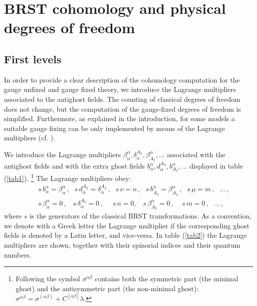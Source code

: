 \documentclass[a4paper,12pt]{article}
\begin{document}

\section{BRST cohomology and physical degrees of freedom}
\label{coho}

\subsection{First levels}
\label{first}

In order to provide a clear description of the cohomology computation
for the gauge unfixed and gauge fixed theory, we introduce the
Lagrange multipliers associated to the antighost fields.  The counting
of classical degrees of freedom does not change, but the computation
of the gauge-fixed degrees of freedom is simplified. Furthermore, as
explained in the introduction, for some models a suitable gauge fixing
can be only implemented by means of the Lagrange multipliers (cf.
\cite{porr_2}).

We introduce the Lagrange multipliers $\beta^\alpha_{\dot\alpha},
\delta^{A_2}_{\dot\alpha}, \beta_{A_2}^{\dot\alpha}, \dots$
associated with the antighost fields and with the extra ghost fields
$b^\alpha_{\dot\alpha}, d^{A_2}_{\dot\alpha}, b_{
  A_2}^{\dot\alpha}, \dots $ displayed in table (\ref{tab1}).
\footnote{Following \cite{GPZ} the symbol $\sigma^{\alpha\beta}$
  contains both the symmetric part (the minimal ghost) and the
  antisymmetric part (the non-minimal ghost): $\sigma^{\alpha \beta}=
  \sigma^{(\alpha \beta)} + C^{[\alpha \beta]}\lambda $.}
The Lagrange multipliers obey: 
\begin{eqnarray}
  \label{lag_mul}
&&  
s \, b^\alpha_{\dot\alpha} = \beta^\alpha_{\dot\alpha}\,,~~~
s \, d^{A_2}_{\dot\alpha} = \delta^{A_2}_{\dot\alpha}\,, ~~~
s \, \nu = n\,, ~~~
s \,  b_{\dot A_2}^{\dot\alpha} = \beta_{\dot A_2}^{\dot\alpha}\,,~~~ 
s \, \mu = m\,, ~~~
\dots\,, 
 \nonumber  \\
&&
s \, \beta^\alpha_{\dot\alpha} = 0\,,~~~~
s \, \delta^{A_2}_{\dot\alpha} = 0\,, ~~~~~~
s \, n = 0, ~~~~
s \, \beta_{\dot A_2}^{\dot\alpha} = 0\,,~~~~~
s \, m = 0\,, ~~~
\dots\,, 
\end{eqnarray}
where $s$ is the generators of the classical BRST transformations. As
a convention, we denote with a Greek letter the Lagrange multiplier if
the corresponding ghost fields is denoted by a Latin letter, and 
vice-versa.  In table (\ref{tab2}) the Lagrange multipliers are shown,
together with their spinorial indices and their quantum numbers.
\end{document}
